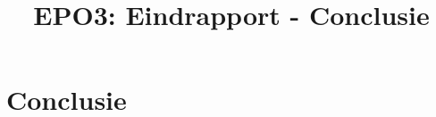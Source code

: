 \documentclass{scrartcl} %
\author{}
\title{EPO3: Eindrapport - Conclusie}
\begin{document}
\chapter{Conclusie}
\label{ch:conclusie}
\end{document}
